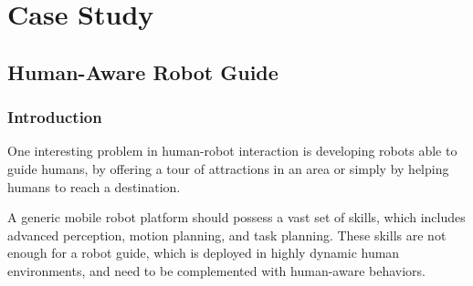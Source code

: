 
\chapter{Case Study} %

\label{chapter:case_study} %




\section{Human-Aware Robot Guide}
\subsection{Introduction}
One interesting problem in human-robot interaction is developing robots able to guide humans, by offering a tour of attractions in an area or simply by helping humans to reach a destination.

A generic mobile robot platform should possess a vast set of skills, which includes advanced perception, motion planning, and task planning. These skills are not enough for a robot guide, which is deployed in highly dynamic human environments, and need to be complemented with human-aware behaviors.

